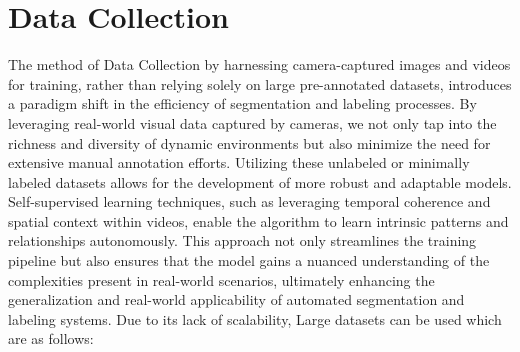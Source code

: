 \clearpage

\section{Data Collection}

The method of Data Collection by harnessing camera-captured images and videos for training, rather than relying solely on large pre-annotated datasets, introduces a paradigm shift in the efficiency of segmentation and labeling processes. By leveraging real-world visual data captured by cameras, we not only tap into the richness and diversity of dynamic environments but also minimize the need for extensive manual annotation efforts. Utilizing these unlabeled or minimally labeled datasets allows for the development of more robust and adaptable models. Self-supervised learning techniques, such as leveraging temporal coherence and spatial context within videos, enable the algorithm to learn intrinsic patterns and relationships autonomously. This approach not only streamlines the training pipeline but also ensures that the model gains a nuanced understanding of the complexities present in real-world scenarios, ultimately enhancing the generalization and real-world applicability of automated segmentation and labeling systems. Due to its lack of scalability, Large datasets can be used which are as follows:

